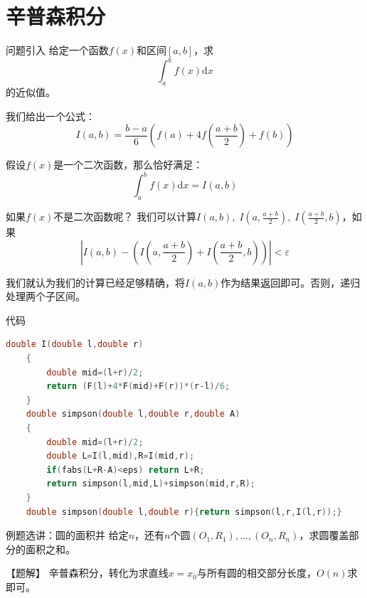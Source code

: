 \documentclass{beamer}
\begin{document}
\section{辛普森积分}

\begin{frame}{问题引入}
    给定一个函数$f(x)$和区间$[a,b]$，求
    \begin{equation*}
        \int_a^b f(x)\text{d}x
    \end{equation*}
    的近似值。
\end{frame}

\begin{frame}
    我们给出一个公式：
    \begin{equation*}
        I(a,b)=\frac{b-a}{6}\left(f(a)+4f\left(\frac{a+b}{2}\right)+f(b)\right)
    \end{equation*}
    
    假设$f(x)$是一个二次函数，那么恰好满足：
    \begin{equation*}
        \int_a^b f(x)\text{d}x=I(a,b)
    \end{equation*}

    如果$f(x)$不是二次函数呢？\pause
    我们可以计算$I(a,b),\;I\left(a,\frac{a+b}{2}\right),\;I\left(\frac{a+b}{2},b\right)$，如果
    \begin{equation*}
        \left|I(a,b)-\left(I\left(a,\frac{a+b}{2}\right)+I\left(\frac{a+b}{2},b\right)\right)\right| < \varepsilon
    \end{equation*}

    我们就认为我们的计算已经足够精确，将$I(a,b)$作为结果返回即可。否则，递归处理两个子区间。
\end{frame}

\begin{frame}[fragile]{代码}
    \begin{minipage}{\linewidth}
    \begin{lstlisting}[language=c++]
    double I(double l,double r)
    {
        double mid=(l+r)/2;
        return (F(l)+4*F(mid)+F(r))*(r-l)/6;
    }
    double simpson(double l,double r,double A)
    {
        double mid=(l+r)/2;
        double L=I(l,mid),R=I(mid,r);
        if(fabs(L+R-A)<eps) return L+R;
        return simpson(l,mid,L)+simpson(mid,r,R);
    }
    double simpson(double l,double r){return simpson(l,r,I(l,r));}
    \end{lstlisting}
    \end{minipage}
\end{frame}

\begin{frame}{例题选讲：圆的面积并}
    给定$n$，还有$n$个圆$(O_1,R_1),...,(O_n,R_n)$，求圆覆盖部分的面积之和。

    \pause
    【题解】 辛普森积分，转化为求直线$x=x_0$与所有圆的相交部分长度，$O(n)$求即可。
\end{frame}
\end{document}
